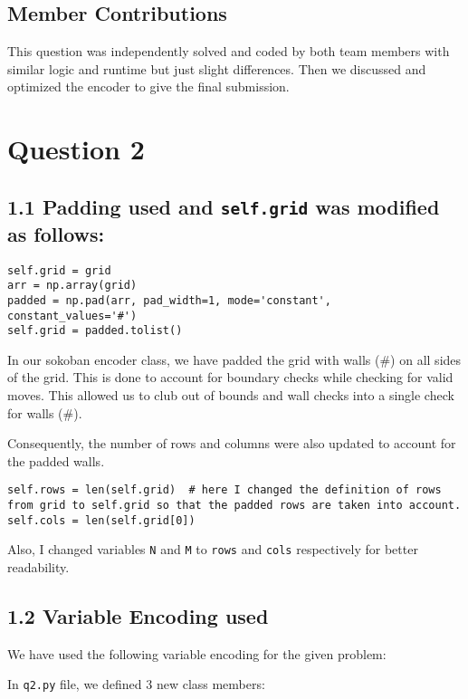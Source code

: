 \documentclass[12pt,a4paper]{article}
\begin{document}
\subsection*{Member Contributions}
This question was independently solved and coded by both team members with similar logic and runtime but just slight differences.
Then we discussed and optimized the encoder to give the final submission. 
\newpage
\section*{Question 2}

\subsection*{1.1 Padding used and \texttt{self.grid} was modified as follows:}

\begin{lstlisting}
self.grid = grid
arr = np.array(grid)
padded = np.pad(arr, pad_width=1, mode='constant', constant_values='#')
self.grid = padded.tolist()
\end{lstlisting}

In our sokoban encoder class, we have padded the grid with walls (\#) on all sides of the grid. This is done to account for boundary checks while checking for valid moves. This allowed us to club out of bounds and wall checks into a single check for walls (\#).

Consequently, the number of rows and columns were also updated to account for the padded walls.

\begin{lstlisting}
self.rows = len(self.grid)  # here I changed the definition of rows from grid to self.grid so that the padded rows are taken into account.
self.cols = len(self.grid[0]) 
\end{lstlisting}

Also, I changed variables \texttt{N} and \texttt{M} to \texttt{rows} and \texttt{cols} respectively for better readability.

\subsection*{1.2 Variable Encoding used}

We have used the following variable encoding for the given problem:

In \texttt{q2.py} file, we defined 3 new class members:
\end{document}
